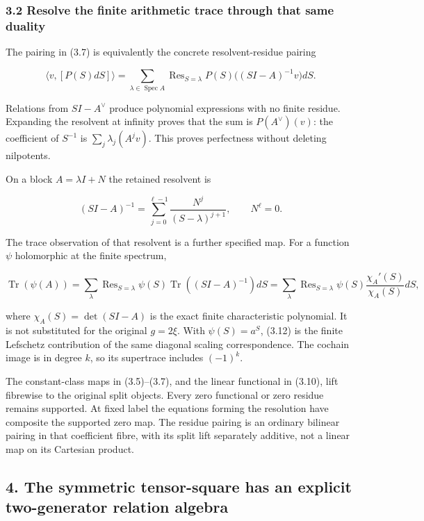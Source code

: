 \documentclass[
]{article}
\begin{document}
\subsubsection{3.2 Resolve the finite arithmetic trace through that same
duality}\label{resolve-the-finite-arithmetic-trace-through-that-same-duality}

The pairing in (3.7) is equivalently the concrete resolvent-residue
pairing

\[\boxed{\langle v,[P(S)dS]\rangle
=\sum_{\lambda\in\operatorname{Spec}A}
\operatorname{Res}_{S=\lambda}
P(S)\bigl((SI-A)^{-1}v\bigr)dS.}\tag{3.10}\]

Relations from \(SI-A^\vee\) produce polynomial expressions with no
finite residue. Expanding the resolvent at infinity proves that the sum
is \(P(A^\vee)(v)\): the coefficient of \(S^{-1}\) is
\(\sum_j\lambda_j(A^jv)\). This proves perfectness without deleting
nilpotents.

On a block \(A=\lambda I+N\) the retained resolvent is

\[(SI-A)^{-1}=\sum_{j=0}^{\ell-1}\frac{N^j}{(S-\lambda)^{j+1}},\qquad N^\ell=0.\tag{3.11}\]

The trace observation of that resolvent is a further specified map. For
a function \(\psi\) holomorphic at the finite spectrum,

\[\boxed{\operatorname{Tr}(\psi(A))=
\sum_\lambda\operatorname{Res}_{S=\lambda}
\psi(S)\operatorname{Tr}((SI-A)^{-1})dS
=\sum_\lambda\operatorname{Res}_{S=\lambda}\psi(S)\frac{\chi_A'(S)}{\chi_A(S)}dS,}\tag{3.12}\]

where \(\chi_A(S)=\det(SI-A)\) is the exact finite characteristic
polynomial. It is not substituted for the original \(g=2\xi\). With
\(\psi(S)=a^S\), (3.12) is the finite Lefschetz contribution of the same
diagonal scaling correspondence. The cochain image is in degree \(k\),
so its supertrace includes \((-1)^k\).

The constant-class maps in (3.5)--(3.7), and the linear functional in
(3.10), lift fibrewise to the original split objects. Every zero
functional or zero residue remains supported. At fixed label the
equations forming the resolution have composite the supported zero map.
The residue pairing is an ordinary bilinear pairing in that coefficient
fibre, with its split lift separately additive, not a linear map on its
Cartesian product.

\subsection{4. The symmetric tensor-square has an explicit two-generator
relation
algebra}\label{the-symmetric-tensor-square-has-an-explicit-two-generator-relation-algebra}
\end{document}
